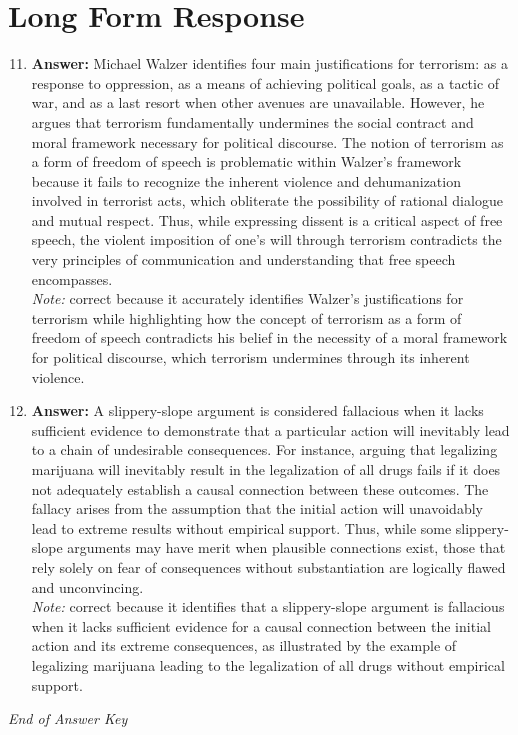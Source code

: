 \documentclass[12pt]{article}
\begin{document}
\section*{Long Form Response}
\begin{enumerate}[label=\arabic*.]
\setcounter{enumi}{10}
\item \textbf{Answer:} Michael Walzer identifies four main justifications for terrorism: as a response to oppression, as a means of achieving political goals, as a tactic of war, and as a last resort when other avenues are unavailable. However, he argues that terrorism fundamentally undermines the social contract and moral framework necessary for political discourse. The notion of terrorism as a form of freedom of speech is problematic within Walzer's framework because it fails to recognize the inherent violence and dehumanization involved in terrorist acts, which obliterate the possibility of rational dialogue and mutual respect. Thus, while expressing dissent is a critical aspect of free speech, the violent imposition of one's will through terrorism contradicts the very principles of communication and understanding that free speech encompasses.
\\ \textit{Note:} correct because it accurately identifies Walzer's justifications for terrorism while highlighting how the concept of terrorism as a form of freedom of speech contradicts his belief in the necessity of a moral framework for political discourse, which terrorism undermines through its inherent violence.
\item \textbf{Answer:} A slippery-slope argument is considered fallacious when it lacks sufficient evidence to demonstrate that a particular action will inevitably lead to a chain of undesirable consequences. For instance, arguing that legalizing marijuana will inevitably result in the legalization of all drugs fails if it does not adequately establish a causal connection between these outcomes. The fallacy arises from the assumption that the initial action will unavoidably lead to extreme results without empirical support. Thus, while some slippery-slope arguments may have merit when plausible connections exist, those that rely solely on fear of consequences without substantiation are logically flawed and unconvincing.
\\ \textit{Note:} correct because it identifies that a slippery-slope argument is fallacious when it lacks sufficient evidence for a causal connection between the initial action and its extreme consequences, as illustrated by the example of legalizing marijuana leading to the legalization of all drugs without empirical support.
\end{enumerate}

\vfill
\noindent\textit{End of Answer Key}
\end{document}
